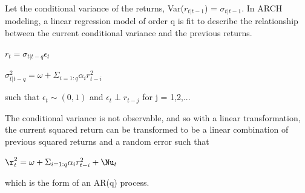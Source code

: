 \documentclass[11pt]{article}\usepackage[]{graphicx}\usepackage[]{color}
\begin{document}
Let the conditional variance of the returns, Var($r_{t|t-1}$) = $\sigma_{t|t-1}$. In ARCH modeling, a linear regression model of order q is fit to describe the relationship between the current conditional variance and the previous returns. 

$r_{t} = \sigma_{t|t-q}\epsilon_{t}$

$\sigma^{2}_{t|t-q} = \omega + \Sigma_{i=1:q} \alpha_{i}r^{2}_{t-i}$

such that $\epsilon_{t} \sim (0,1)$ and $\epsilon_{t} \perp r_{t-j}$ for j = 1,2,...

The conditional variance is not observable, and so with a linear transformation, the current squared return can be transformed to be a linear combination of previous squared returns and a random error such that

$\r^{2}_{t} = \omega + \Sigma_{i=1:q} \alpha_{i}r^{2}_{t-i} + \Nu_{t}$

which is the form of an AR(q) process. 
\end{document}
